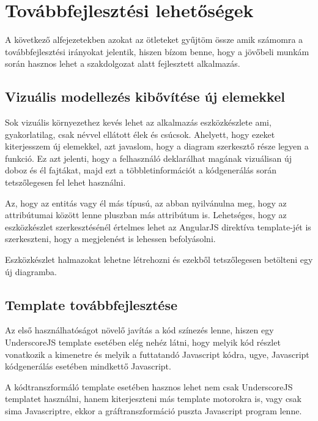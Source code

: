 
\section{Továbbfejlesztési lehetőségek}

A következő alfejezetekben azokat az ötleteket gyűjtöm össze amik számomra a továbbfejlesztési irányokat jelentik, hiszen bízom benne, hogy a jövőbeli munkám során hasznos lehet a szakdolgozat alatt fejlesztett alkalmazás.

\subsection{Vizuális modellezés kibővítése új elemekkel}

Sok vizuális környezethez kevés lehet az alkalmazás eszközkészlete ami, gyakorlatilag, csak névvel ellátott élek és csúcsok.
Ahelyett, hogy ezeket kiterjesszem új elemekkel, azt javaslom, hogy a diagram szerkesztő része legyen a funkció. Ez azt jelenti, hogy a felhasználó deklarálhat magának vizuálisan új doboz és él fajtákat, majd ezt a többletinformációt a kódgenerálás során tetszőlegesen fel lehet használni.

Az, hogy az entitás vagy él más típusú, az abban nyilvánulna meg, hogy az attribútumai között lenne pluszban más attribútum is. Lehetséges, hogy az eszközkészlet szerkesztésénél értelmes lehet az AngularJS direktíva template-jét is szerkeszteni, hogy a megjelenést is lehessen befolyásolni. 

Eszközkészlet halmazokat lehetne létrehozni és ezekből tetszőlegesen betölteni egy új diagramba.


\subsection{Template továbbfejlesztése}

Az első használhatóságot növelő javítás a kód színezés lenne, hiszen egy UnderscoreJS template esetében elég nehéz látni, hogy melyik kód részlet vonatkozik a kimenetre és melyik a futtatandó Javascript kódra, ugye, Javascript kódgenerálás esetében mindkettő Javascript. 

A kódtranszformáló template esetében hasznos lehet nem csak UnderscoreJS templatet használni, hanem kiterjeszteni más template motorokra is, vagy csak sima Javascriptre, ekkor a gráftranszformáció puszta Javascript program lenne.

